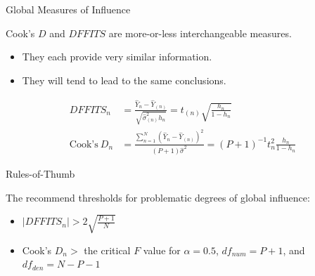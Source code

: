 \documentclass{beamer}\usepackage[]{graphicx}\usepackage[]{color}
\begin{document}

\begin{frame}{Global Measures of Influence}
  
  Cook's $D$ and $\textit{DFFITS}$ are more-or-less interchangeable measures.
  \vb
  \begin{itemize}
  \item They each provide very similar information.
    \vb
  \item They will tend to lead to the same conclusions.
  \end{itemize}
  \begin{align*}
    \textit{DFFITS}_n &= \frac{\hat{Y}_n - \hat{Y}_{(n)}}{\sqrt{\hat{\sigma}^2_{(n)} h_n}} = t_{(n)} \sqrt{\frac{h_n}{1 - h_n}}\\[8pt]
    \text{Cook's} ~ D_n &= \frac{\sum_{n = 1}^N \left( \hat{Y}_n - \hat{Y}_{(n)} \right)^2}{\left(P + 1\right) \hat{\sigma}^2} = (P + 1)^{-1} t_n^2 \frac{h_n}{1 - h_n}
  \end{align*}
  
\end{frame}


\begin{frame}{Rules-of-Thumb}
  
  The recommend thresholds for problematic degrees of global influence: 
  \vb
  \begin{itemize}
  \item $|\textit{DFFITS}_n| > 2\sqrt{\frac{P + 1}{N}}$
    \vb
  \item Cook's $D_n >$ the critical $F$ value for $\alpha = 0.5$, $df_{num} =
    P + 1$, and $df_{den} = N - P - 1$
  \end{itemize}
  
\end{frame}

\watermarkoff %
\end{document}
